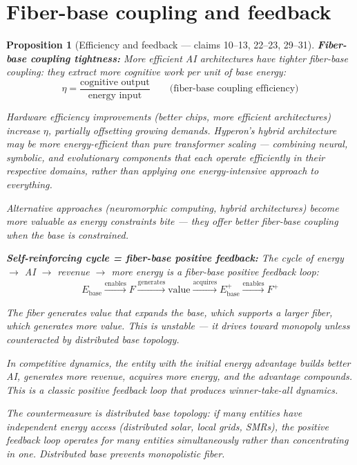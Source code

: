 \documentclass[11pt,a4paper]{article}
\newtheorem{proposition}[definition]{Proposition}
\begin{document}

\section{Fiber-base coupling and feedback}
\label{sec:coupling}

\begin{proposition}[Efficiency and feedback --- claims 10--13, 22--23, 29--31]
\label{prop:coupling-v1}
\textbf{Fiber-base coupling tightness:}
More efficient AI architectures have tighter fiber-base coupling: they
extract more cognitive work per unit of base energy:
\[
  \eta = \frac{\text{cognitive output}}{\text{energy input}}
  \qquad \text{(fiber-base coupling efficiency)}
\]

Hardware efficiency improvements (better chips, more efficient
architectures) increase $\eta$, partially offsetting growing demands.
Hyperon's hybrid architecture may be more energy-efficient than pure
transformer scaling --- combining neural, symbolic, and evolutionary
components that each operate efficiently in their respective domains,
rather than applying one energy-intensive approach to everything.

Alternative approaches (neuromorphic computing, hybrid architectures)
become more valuable as energy constraints bite --- they offer better
fiber-base coupling when the base is constrained.

\textbf{Self-reinforcing cycle = fiber-base positive feedback:}
The cycle of energy $\to$ AI $\to$ revenue $\to$ more energy is a
fiber-base positive feedback loop:
\[
  E_{\text{base}} \xrightarrow{\text{enables}} F
  \xrightarrow{\text{generates}} \text{value}
  \xrightarrow{\text{acquires}} E_{\text{base}}^+
  \xrightarrow{\text{enables}} F^+
\]

The fiber generates value that expands the base, which supports a
larger fiber, which generates more value. This is unstable --- it
drives toward monopoly unless counteracted by distributed base topology.

In competitive dynamics, the entity with the initial energy advantage
builds better AI, generates more revenue, acquires more energy, and
the advantage compounds. This is a classic positive feedback loop that
produces winner-take-all dynamics.

The countermeasure is distributed base topology: if many entities have
independent energy access (distributed solar, local grids, SMRs), the
positive feedback loop operates for many entities simultaneously rather
than concentrating in one. Distributed base prevents monopolistic fiber.
\end{proposition}
\end{document}
